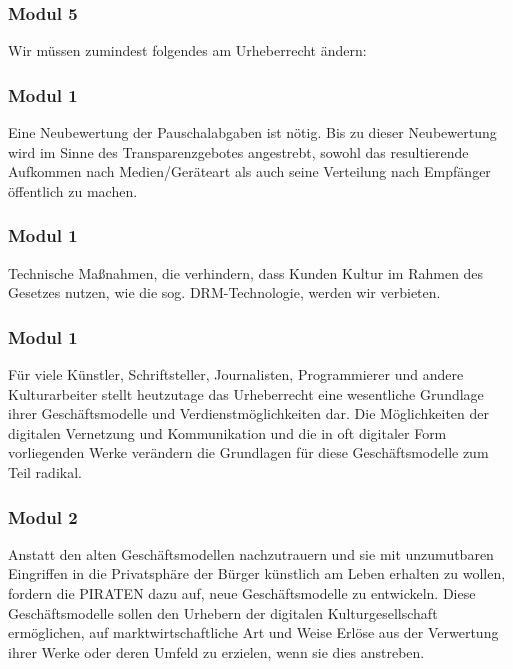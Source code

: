 \subsubsection{Modul 5}
\abstimmung
Wir müssen zumindest folgendes am Urheberrecht ändern:
 

\subsubsection{Modul 1}
\abstimmung
Eine Neubewertung der Pauschalabgaben ist nötig. Bis zu dieser Neubewertung wird im Sinne des Transparenzgebotes angestrebt, sowohl das resultierende Aufkommen nach Medien/Geräteart als auch seine Verteilung nach Empfänger öffentlich zu machen.
 

\subsubsection{Modul 1}
\abstimmung
Technische Maßnahmen, die verhindern, dass Kunden Kultur im Rahmen des Gesetzes nutzen, wie die sog. DRM-Technologie, werden wir verbieten.
 

\subsubsection{Modul 1}
\abstimmung
Für viele Künstler, Schriftsteller, Journalisten, Programmierer und andere Kulturarbeiter stellt heutzutage das Urheberrecht eine wesentliche Grundlage ihrer Geschäftsmodelle und Verdienstmöglichkeiten dar. Die Möglichkeiten der digitalen Vernetzung und Kommunikation und die in oft digitaler Form vorliegenden Werke verändern die Grundlagen für diese Geschäftsmodelle zum Teil radikal.

\subsubsection{Modul 2}
\abstimmung
Anstatt den alten Geschäftsmodellen nachzutrauern und sie mit unzumutbaren Eingriffen in die Privatsphäre der Bürger künstlich am Leben erhalten zu wollen, fordern die PIRATEN dazu auf, neue Geschäftsmodelle zu entwickeln. Diese Geschäftsmodelle sollen den Urhebern der digitalen Kulturgesellschaft ermöglichen, auf marktwirtschaftliche Art und Weise Erlöse aus der Verwertung ihrer Werke oder deren Umfeld zu erzielen, wenn sie dies anstreben.

